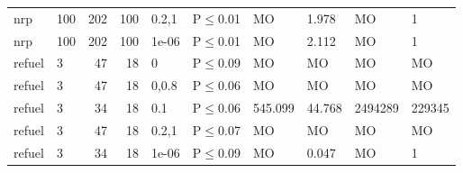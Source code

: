 \begin{longtable}{llrrllllll}
 nrp           & 100      &    	202 & 100 & 0.2,1 & P$\leq$0.01  & MO       & 1.978   & MO      & 1       \\
 nrp           & 100      &    	202 & 100 & 1e-06 & P$\leq$0.01  & MO       & 2.112   & MO      & 1       \\
 refuel        & 3        &     	47 &  18 & 0     & P$\leq$0.09  & MO       & MO      & MO      & MO      \\
 refuel        & 3        &     	47 &  18 & 0,0.8 & P$\leq$0.06  & MO       & MO      & MO      & MO      \\
 refuel        & 3        &     	34 &  18 & 0.1   & P$\leq$0.06  & 545.099  & 44.768  & 2494289 & 229345  \\
 refuel        & 3        &     	47 &  18 & 0.2,1 & P$\leq$0.07  & MO       & MO      & MO      & MO      \\
 refuel        & 3        &     	34 &  18 & 1e-06 & P$\leq$0.09  & MO       & 0.047   & MO      & 1       \\
\bottomrule
\end{longtable}
